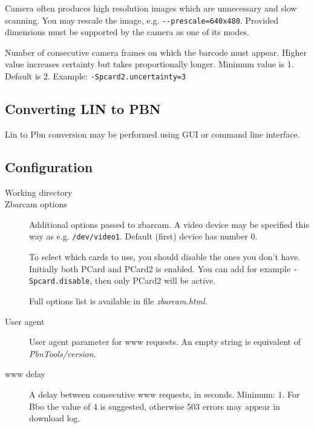 \documentclass[polish,a4paper,11pt,oneside]{article}
\begin{document}
\begin{description}
\begin{description}
    Camera often produces high resolution images which are unnecessary and
    slow scanning. You may rescale the image, e.g. \verb!--prescale=640x480!.
    Provided dimensions must be supported by the camera as one of its modes.

    \item[uncertainty]

    Number of consecutive camera frames on which the barcode must appear.
    Higher value increases certainty but takes proportionally longer.
    Minimum value is 1. Default is 2.
    Example: \verb!-Spcard2.uncertainty=3!

  \end{description}
  
\end{description}

\subsection{Converting LIN to PBN}

Lin to Pbn conversion may be performed using GUI or command line
interface.


\subsection{Configuration} \label{konfig} %

\begin{description}
\item[Working directory]
\item[Zbarcam options]
  Additional options passed to zbarcam.
  A video device may be specified this way as e.g. \verb!/dev/video1!.
  Default (first) device has number 0.

  
  To select which cards to use, you should disable the ones you don't have.
  Initially both PCard and PCard2 is enabled. 
  You can add for example \verb!-Spcard.disable!, then only PCard2 will be active.
  
  Full options list is available in file {\em zbarcam.html}.
\item[User agent]
  User agent parameter for www requests. An empty string is equivalent of
  {\em PbnTools/version}.
\item[www delay]
  A delay between consecutive www requests, in seconds.
  Minimum: 1. For Bbo the value of 4 is suggested,
  otherwise 503 errors may appear in download log.

\end{description}
\end{document}
